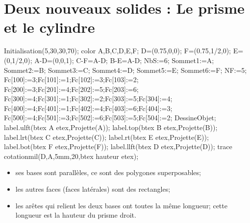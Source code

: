 \section{Deux nouveaux solides : Le prisme et le cylindre}
\begin{definition}
   \begin{minipage}{0.25\linewidth}
      \begin{Geometrie}[CoinBG={u*(-10,-10)},CoinHD={u*(10,10)},TypeTrace="Espace"]
         Initialisation(5,30,30,70);
         color A,B,C,D,E,F;
         D=(0.75,0,0);
         F=(0.75,1/2,0);
         E=(0,1/2,0);
         A-D=(0,0,1);
         C-F=A-D;
         B-E=A-D;
         NbS:=6;
         Sommet1:=A;
         Sommet2:=B;
         Sommet3:=C;
         Sommet4:=D;
         Sommet5:=E;
         Sommet6:=F;
         NF:=5;
         Fc[100]:=3;Fc[101]:=1;Fc[102]:=3;Fc[103]:=2;
         Fc[200]:=3;Fc[201]:=4;Fc[202]:=5;Fc[203]:=6;
         Fc[300]:=4;Fc[301]:=1;Fc[302]:=2;Fc[303]:=5;Fc[304]:=4;
         Fc[400]:=4;Fc[401]:=1;Fc[402]:=4;Fc[403]:=6;Fc[404]:=3;
         Fc[500]:=4;Fc[501]:=3;Fc[502]:=6;Fc[503]:=5;Fc[504]:=2;
         DessineObjet;
         label.ulft(btex A etex,Projette(A));
         label.top(btex B etex,Projette(B));
         label.lrt(btex C etex,Projette(C));
         label.rt(btex E etex,Projette(E));
         label.bot(btex F etex,Projette(F));
         label.llft(btex D etex,Projette(D));
         trace cotationmil(D,A,5mm,20,btex hauteur etex);
      \end{Geometrie} 
   \end{minipage}
   \hfill
   \begin{minipage}{0.7\linewidth}
      \begin{itemize}
         \item  ses bases sont parallèles, ce sont des polygones superposables;
         \item  les autres faces (faces latérales) sont des rectangles;
         \item  les arêtes qui relient les deux bases ont toutes la même longueur; cette longueur est la hauteur du prisme droit.
      \end{itemize}
   \end{minipage}
\end{definition}

